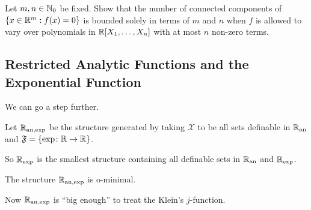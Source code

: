 \begin{exercise}
  Let $m,n\in{\mathbb{N}}_0$ be fixed. Show that the number of connected
  components of 
  $\{x\in {\mathbb{R}}^m : f(x) =0\}$ is bounded solely in terms of $m$ and $n$
  when $f$ is allowed to vary over
  polynomials in ${\mathbb{R}}[X_1,\ldots,X_n]$ with at most $n$ non-zero
  terms.
\end{exercise}

\subsection{Restricted Analytic Functions and the Exponential Function}
We can go a step further.

\begin{definition}
  Let ${{\mathbb{R}}_{\mathrm{an,exp}}}$ be the structure generated by taking $\mathscr{X}$ to
  be all sets definable in ${{\mathbb{R}}_{\mathrm{an}}}$
  and $\mathfrak{F} = \{ \exp \colon {\mathbb{R}}\rightarrow{\mathbb{R}}\}$. 
\end{definition}

So ${{\mathbb{R}}_{\mathrm{exp}}}$ is the smallest structure containing all definable sets in
${{\mathbb{R}}_{\mathrm{an}}}$ and ${{\mathbb{R}}_{\mathrm{exp}}}$.

\begin{theorem}
  The structure ${{\mathbb{R}}_{\mathrm{an,exp}}}$ is o-minimal.
\end{theorem}

Now ${{\mathbb{R}}_{\mathrm{an,exp}}}$ is ``big enough'' to treat the Klein's
$j$-function. 

